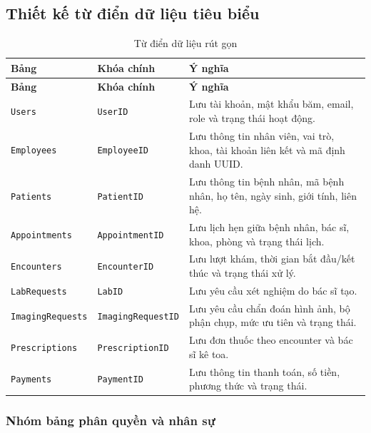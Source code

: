 \documentclass[12pt,a4paper]{article}
\numberwithin{figure}{subsection}
\numberwithin{table}{subsection}
\begin{document}
\subsection{Thiết kế từ điển dữ liệu tiêu biểu}

\begin{longtable}{|p{3.2cm}|p{2.8cm}|p{7.8cm}|}
\caption{Từ điển dữ liệu rút gọn} \\
\hline
\textbf{Bảng} & \textbf{Khóa chính} & \textbf{Ý nghĩa} \\
\hline
\endfirsthead
\hline
\textbf{Bảng} & \textbf{Khóa chính} & \textbf{Ý nghĩa} \\
\hline
\endhead
\texttt{Users} & \texttt{UserID} & Lưu tài khoản, mật khẩu băm, email, role và trạng thái hoạt động. \\
\hline
\texttt{Employees} & \texttt{EmployeeID} & Lưu thông tin nhân viên, vai trò, khoa, tài khoản liên kết và mã định danh UUID. \\
\hline
\texttt{Patients} & \texttt{PatientID} & Lưu thông tin bệnh nhân, mã bệnh nhân, họ tên, ngày sinh, giới tính, liên hệ. \\
\hline
\texttt{Appointments} & \texttt{AppointmentID} & Lưu lịch hẹn giữa bệnh nhân, bác sĩ, khoa, phòng và trạng thái lịch. \\
\hline
\texttt{Encounters} & \texttt{EncounterID} & Lưu lượt khám, thời gian bắt đầu/kết thúc và trạng thái xử lý. \\
\hline
\texttt{LabRequests} & \texttt{LabID} & Lưu yêu cầu xét nghiệm do bác sĩ tạo. \\
\hline
\texttt{ImagingRequests} & \texttt{ImagingRequestID} & Lưu yêu cầu chẩn đoán hình ảnh, bộ phận chụp, mức ưu tiên và trạng thái. \\
\hline
\texttt{Prescriptions} & \texttt{PrescriptionID} & Lưu đơn thuốc theo encounter và bác sĩ kê toa. \\
\hline
\texttt{Payments} & \texttt{PaymentID} & Lưu thông tin thanh toán, số tiền, phương thức và trạng thái. \\
\hline
\end{longtable}

\subsubsection{Nhóm bảng phân quyền và nhân sự}
\end{document}
